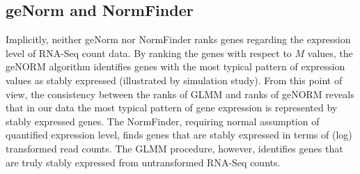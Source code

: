 \documentclass[11pt, a4paper]{article}
\begin{document}
\subsection{geNorm and NormFinder}
Implicitly, neither geNorm nor NormFinder ranks genes regarding the expression level of RNA-Seq count data. By ranking the genes with respect to $M$ values,  the geNORM algorithm identifies genes with the most typical pattern of expression values as stably expressed (illustrated by simulation study). From this point of view, the consistency between the ranks of  GLMM and ranks of geNORM reveals that in our data the most typical pattern of gene expression is represented by stably expressed genes. The NormFinder, requiring normal assumption of quantified expression level,  finds genes that are stably expressed in terms of (log) transformed read counts. The GLMM procedure, however, identifies genes that are truly stably expressed from untransformed RNA-Seq counts.
\end{document}
